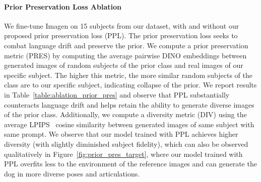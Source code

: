 \paragraph{Prior Preservation Loss Ablation}
We fine-tune Imagen on 15 subjects from our dataset, with and without our proposed prior preservation loss (PPL). The prior preservation loss seeks to combat language drift and preserve the prior. We compute a prior preservation metric (PRES) by computing the average pairwise DINO embeddings between generated images of random subjects of the prior class and real images of our specific subject. The higher this metric, the more similar random subjects of the class are to our specific subject, indicating collapse of the prior. We report results in Table~\ref{table:ablation_prior_pres} and observe that PPL substantially counteracts language drift and helps retain the ability to generate diverse images of the prior class. Additionally, we compute a diversity metric (DIV) using the average LPIPS~\cite{zhang2018perceptual} cosine similarity between generated images of same subject with same prompt. We observe that our model trained with PPL achieves higher diversity (with slightly diminished subject fidelity), which can also be observed qualitatively in Figure~\ref{fig:prior_pres_target}, where our model trained with PPL overfits less to the environment of the reference images and can generate the dog in more diverse poses and articulations.

\begin{table}[t]
\centering
{}
\caption{Prior preservation loss (PPL) ablation displaying a prior preservation (PRES) metric, diversity metric (DIV) and subject and prompt fidelity metrics.
\label{table:ablation_prior_pres}}
\end{table}

\begin{table}[t]
\centering
{}
\caption{Class name ablation with subject fidelity metrics.
\label{table:class_name}
\vspace{-12pt}}
\end{table}


